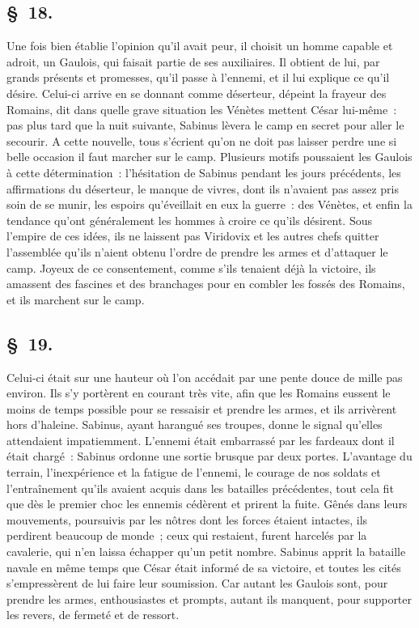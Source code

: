 \documentclass[french,twoside]{book} %
\begin{document}
\subsection[{§ 18.}]{ \textsc{§ 18.} }
\noindent Une fois bien établie l’opinion qu’il avait peur, il choisit un homme capable et adroit, un Gaulois, qui faisait partie de ses auxiliaires. Il obtient de lui, par grands présents et promesses, qu’il passe à l’ennemi, et il lui explique ce qu’il désire. Celui-ci arrive en se donnant comme déserteur, dépeint la frayeur des Romains, dit dans quelle grave situation les Vénètes mettent César lui-même : pas plus tard que la nuit suivante, Sabinus lèvera le camp en secret pour aller le secourir. A cette nouvelle, tous s’écrient qu’on ne doit pas laisser perdre une si belle occasion il faut marcher sur le camp. Plusieurs motifs poussaient les Gaulois à cette détermination : l’hésitation de Sabinus pendant les jours précédents, les affirmations du déserteur, le manque de vivres, dont ils n’avaient pas assez pris soin de se munir, les espoirs qu’éveillait en eux la guerre : des Vénètes, et enfin la tendance qu’ont généralement les hommes à croire ce qu’ils désirent. Sous l’empire de ces idées, ils ne laissent pas Viridovix et les autres chefs quitter l’assemblée qu’ils n’aient obtenu l’ordre de prendre les armes et d’attaquer le camp. Joyeux de ce consentement, comme s’ils tenaient déjà la victoire, ils amassent des fascines et des branchages pour en combler les fossés des Romains, et ils marchent sur le camp.
\subsection[{§ 19.}]{ \textsc{§ 19.} }
\noindent Celui-ci était sur une hauteur où l’on accédait par une pente douce de mille pas environ. Ils s’y portèrent en courant très vite, afin que les Romains eussent le moins de temps possible pour se ressaisir et prendre les armes, et ils arrivèrent hors d’haleine. Sabinus, ayant harangué ses troupes, donne le signal qu’elles attendaient impatiemment. L'ennemi était embarrassé par les fardeaux dont il était chargé : Sabinus ordonne une sortie brusque par deux portes. L'avantage du terrain, l’inexpérience et la fatigue de l’ennemi, le courage de nos soldats et l’entraînement qu’ils avaient acquis dans les batailles précédentes, tout cela fit que dès le premier choc les ennemis cédèrent et prirent la fuite. Gênés dans leurs mouvements, poursuivis par les nôtres dont les forces étaient intactes, ils perdirent beaucoup de monde ; ceux qui restaient, furent harcelés par la cavalerie, qui n’en laissa échapper qu’un petit nombre. Sabinus apprit la bataille navale en même temps que César était informé de sa victoire, et toutes les cités s’empressèrent de lui faire leur soumission. Car autant les Gaulois sont, pour prendre les armes, enthousiastes et prompts, autant ils manquent, pour supporter les revers, de fermeté et de ressort.
\end{document}

